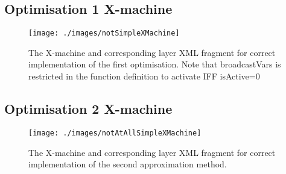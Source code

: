 \documentclass[11pt,a4paper]{article}
\begin{document}
\subsection{Optimisation 1 X-machine}
\label{notSimpleXMachineAppendix}
\begin{figure}[H]
\texttt{[image: ./images/notSimpleXMachine]}
\caption[Optimisation 1 X-machine]{The X-machine and corresponding layer XML fragment for correct implementation of the first optimisation. Note that broadcastVars is restricted in the function definition to activate IFF isActive=0}
\end{figure}

\subsection{Optimisation 2 X-machine}
\label{notAtAllAppendix}
\begin{figure}[H]
\texttt{[image: ./images/notAtAllSimpleXMachine]}
\caption[Optimisation 2 X-machine]{The X-machine and corresponding layer XML fragment for correct implementation of the second approximation method.}
\end{figure}
\end{document}

